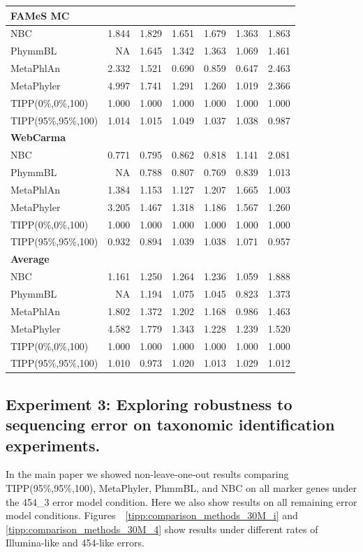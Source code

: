 \begin{table}[hptb]
\begin{center}
{\begin{tabular}{|l|r|r|r|r|r|r|}
\hline
{\bf FAMeS MC}&&&&&&\\
\hline
NBC&1.844&1.829&1.651&1.679&1.363&1.863\\
PhymmBL&NA&1.645&1.342&1.363&1.069&1.461\\
MetaPhlAn&2.332&1.521&0.690&0.859&0.647&2.463\\
MetaPhyler&4.997&1.741&1.291&1.260&1.019&2.366\\
TIPP(0\%,0\%,100)&1.000&1.000&1.000&1.000&1.000&1.000\\
TIPP(95\%,95\%,100)&1.014&1.015&1.049&1.037&1.038&0.987\\
\hline
{\bf WebCarma}&&&&&&\\
\hline
NBC&0.771&0.795&0.862&0.818&1.141&2.081\\
PhymmBL&NA&0.788&0.807&0.769&0.839&1.013\\
MetaPhlAn&1.384&1.153&1.127&1.207&1.665&1.003\\
MetaPhyler&3.205&1.467&1.318&1.186&1.567&1.260\\
TIPP(0\%,0\%,100)&1.000&1.000&1.000&1.000&1.000&1.000\\
TIPP(95\%,95\%,100)&0.932&0.894&1.039&1.038&1.071&0.957\\
\hline
{\bf Average}&&&&&&\\
\hline
NBC&1.161&1.250&1.264&1.236&1.059&1.888\\
PhymmBL&NA&1.194&1.075&1.045&0.823&1.373\\
MetaPhlAn&1.802&1.372&1.202&1.168&0.986&1.463\\
MetaPhyler&4.582&1.779&1.343&1.228&1.239&1.520\\
TIPP(0\%,0\%,100)&1.000&1.000&1.000&1.000&1.000&1.000\\
TIPP(95\%,95\%,100)&1.010&0.973&1.020&1.013&1.029&1.012\\
\hline
\end{tabular}}
\end{center}
\end{table}

\subsection{Experiment 3: Exploring robustness to sequencing error on  taxonomic identification  experiments.}

In the main paper we showed non-leave-one-out results comparing TIPP(95\%,95\%,100), MetaPhyler, PhmmBL, and NBC on all marker genes under the 454\_3 error model condition. 
Here we also show results on all remaining error model conditions. 
Figures~~\ref{tipp:comparison_methods_30M_i} and \ref{tipp:comparison_methods_30M_4} show results
 under different rates of Illumina-like and 454-like errors.
 
